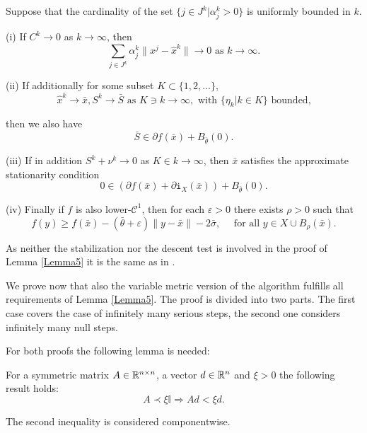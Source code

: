 \begin{lemma}\label{Lemma5}
	Suppose that the cardinality of the set \(\{j \in J^k| \alpha_j^k > 0\}\) is uniformly bounded in \(k\).
	
	(i) If \(C^k \to 0\) as \(k \to \infty\), then 
	\[ \sum_{j \in J^k}\alpha_j^k\|x^j-\hat{x}^k\| \to 0 \text{ as } k \to \infty. \]
	
	(ii) If additionally for some subset \(K \subset \{1,2,\dots\}\),
	\[\hat{x}^k \to \bar{x}, S^k \to \bar{S} \text{ as } K \ni k \to \infty, \text{ with } \{\eta_k|k \in K\} \text{ bounded,} \]
	
	then we also have 
	\[\bar{S} \in \partial f(\bar{x})+B_{\bar{\theta}}(0).\]
	
	(iii) If in addition \(S^k + \nu^k \to 0\) as \(K \in k \to \infty\), then \(\bar{x}\) satisfies the approximate stationarity condition 
	\begin{equation}
		0 \in \left(\partial f(\bar{x}) + \partial \mathtt{i}_X(\bar{x}) \right) + B_{\bar{\theta}}(0).
	\end{equation}
	
	(iv) Finally if \(f\) is also lower-\(\mathcal{C}^1\), then for each \(\varepsilon > 0\) there exists \(\rho > 0\) such that
	\begin{equation}
		f(y) \geq f(\bar{x})-(\bar{\theta}+\varepsilon)\|y-\bar{x}\|-2\bar{\sigma}, \quad \text{ for all } y \in X\cup B_{\rho}(\bar{x}).
	\end{equation}
\end{lemma}

As neither the stabilization nor the descent test is involved in the proof of Lemma \ref{Lemma5} it is the same as in \cite{Hare2016}.

We prove now that also the variable metric version of the algorithm fulfills all requirements of Lemma \ref{Lemma5}.
The proof is divided into two parts. The first case covers the case of infinitely many serious steps, the second one considers infinitely many null steps.

For both proofs the following lemma is needed:

\begin{lemma}
	For a symmetric matrix \(A \in \mathbb{R}^{n\times n}\), a vector \(d\in \mathbb{R}^n\) and \(\xi > 0\) the following result holds: 
	\[ A \prec \xi \mathbb{I} \Rightarrow Ad < \xi d. \]
	
	The second inequality is considered componentwise.
\end{lemma}

